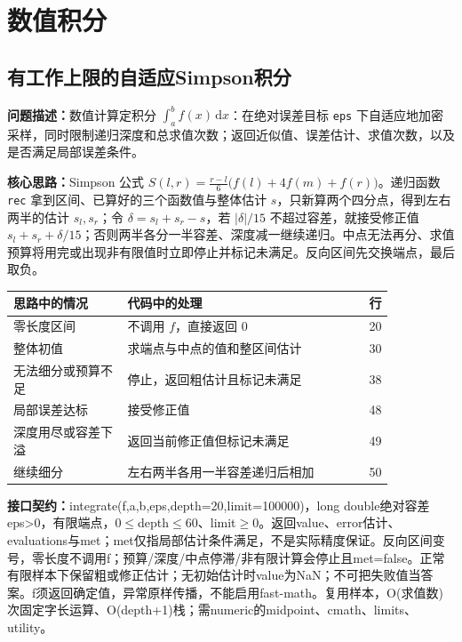 \newpage

\section{数值积分}

\subsection{有工作上限的自适应Simpson积分}\label{compact-AdaptiveSimpson}

\noindent\textbf{问题描述：}\allowbreak 数值计算定积分 $\int_a^b f(x)\,\mathrm dx$：在绝对误差目标 \texttt{eps} 下自适应地加密采样，同时限制递归深度和总求值次数；返回近似值、误差估计、求值次数，以及是否满足局部误差条件。

\textbf{核心思路：}\allowbreak Simpson 公式 $S(l,r)=\frac{r-l}{6}\bigl(f(l)+4f(m)+f(r)\bigr)$。递归函数 \texttt{rec} 拿到区间、已算好的三个函数值与整体估计 $s$，只新算两个四分点，得到左右两半的估计 $s_l,s_r$；令 $\delta=s_l+s_r-s$，若 $|\delta|/15$ 不超过容差，就接受修正值 $s_l+s_r+\delta/15$；否则两半各分一半容差、深度减一继续递归。中点无法再分、求值预算将用完或出现非有限值时立即停止并标记未满足。反向区间先交换端点，最后取负。

\begin{center}\small
\begin{tabular}{@{}p{0.30\linewidth}p{0.55\linewidth}r@{}}
\toprule
思路中的情况 & 代码中的处理 & 行\\
\midrule
零长度区间 & 不调用 $f$，直接返回 0 & 20\\
整体初值 & 求端点与中点的值和整区间估计 & 30\\
无法细分或预算不足 & 停止，返回粗估计且标记未满足 & 38\\
局部误差达标 & 接受修正值 & 48\\
深度用尽或容差下溢 & 返回当前修正值但标记未满足 & 49\\
继续细分 & 左右两半各用一半容差递归后相加 & 50\\
\bottomrule
\end{tabular}
\end{center}



{\sloppy{}\noindent\textbf{接口契约：}integrate(f,a,b,eps,depth=20,limit=100000)，long double绝对容差eps>0，有限端点，0$\le$depth$\le$60、limit$\ge$0。返回value、error估计、evaluations与met；met仅指局部估计条件满足，不是实际精度保证。反向区间变号，零长度不调用f；预算/深度/中点停滞/非有限计算会停止且met=false。正常有限样本下保留粗或修正估计；无初始估计时value为NaN；不可把失败值当答案。f须返回确定值，异常原样传播，不能启用fast-math。复用样本，O(求值数)次固定字长运算、O(depth+1)栈；需numeric的midpoint、cmath、limits、utility。\par}

